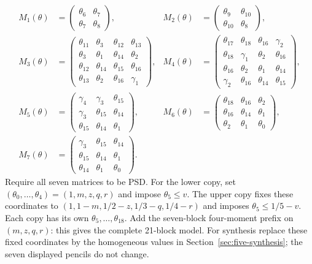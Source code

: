 \documentclass[pdflatex,sn-mathphys-num]{sn-jnl}
\theoremstyle{thmstyleone}
\theoremstyle{thmstyletwo}\newtheorem{remark}[theorem]{Remark}
\begin{document}
\begin{align*}
M_{1}(\theta)&=\begin{pmatrix}
\theta_{6}&\theta_{7}\\\theta_{7}&\theta_{8}
\end{pmatrix},&
M_{2}(\theta)&=\begin{pmatrix}
\theta_{9}&\theta_{10}\\\theta_{10}&\theta_{8}
\end{pmatrix},\\[2mm]
M_{3}(\theta)&=\begin{pmatrix}
\theta_{11}&\theta_{3}&\theta_{12}&\theta_{13}\\
\theta_{3}&\theta_{1}&\theta_{14}&\theta_{2}\\
\theta_{12}&\theta_{14}&\theta_{15}&\theta_{16}\\
\theta_{13}&\theta_{2}&\theta_{16}&\gamma_{1}
\end{pmatrix},&
M_{4}(\theta)&=\begin{pmatrix}
\theta_{17}&\theta_{18}&\theta_{16}&\gamma_{2}\\
\theta_{18}&\gamma_{1}&\theta_{2}&\theta_{16}\\
\theta_{16}&\theta_{2}&\theta_{1}&\theta_{14}\\
\gamma_{2}&\theta_{16}&\theta_{14}&\theta_{15}
\end{pmatrix},\\[2mm]
M_{5}(\theta)&=\begin{pmatrix}
\gamma_{4}&\gamma_{3}&\theta_{15}\\
\gamma_{3}&\theta_{15}&\theta_{14}\\
\theta_{15}&\theta_{14}&\theta_{1}
\end{pmatrix},&
M_{6}(\theta)&=\begin{pmatrix}
\theta_{18}&\theta_{16}&\theta_{2}\\
\theta_{16}&\theta_{14}&\theta_{1}\\
\theta_{2}&\theta_{1}&\theta_{0}
\end{pmatrix},\\[2mm]
M_{7}(\theta)&=\begin{pmatrix}
\gamma_{3}&\theta_{15}&\theta_{14}\\
\theta_{15}&\theta_{14}&\theta_{1}\\
\theta_{14}&\theta_{1}&\theta_{0}
\end{pmatrix}.
\end{align*}
Require all seven matrices to be PSD. For the lower copy, set
$(\theta_0,\ldots,\theta_4)=(1,m,z,q,r)$ and impose $\theta_5\le v$.
The upper copy fixes these coordinates to
$(1,1-m,1/2-z,1/3-q,1/4-r)$ and imposes $\theta_5\le1/5-v$.
Each copy has its own $\theta_5,\ldots,\theta_{18}$. Add the seven-block
four-moment prefix on $(m,z,q,r)$: this gives the complete 21-block model.
For synthesis replace these fixed coordinates by the homogeneous values in
Section~\ref{sec:five-synthesis}; the seven displayed pencils do not change.
\end{document}
